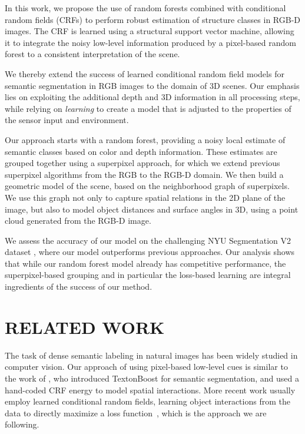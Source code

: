 \documentclass[a4paper, 10pt, conference]{ieeeconf}      %
\begin{document}
In this work, we propose the use of random forests combined with conditional
random fields (CRFs) to perform robust estimation of structure classes in RGB-D
images. The CRF is learned using a structural support vector machine,
allowing it to integrate the noisy low-level information produced by a pixel-based
random forest to a consistent interpretation of the scene.

We thereby extend the success of learned conditional random field models for
semantic segmentation in RGB images to the domain of 3D scenes.
Our emphasis lies on exploiting the additional depth and 3D information in all
processing steps, while relying on \emph{learning} to create a model that 
is adjusted to the properties of the sensor input and environment.

Our approach starts with a random forest, providing a noisy local estimate
of semantic classes based on color and depth information. These estimates
are grouped together using a superpixel approach, for which we extend previous
superpixel algorithms from the RGB to the RGB-D domain.
We then build a geometric model of the scene, based on the neighborhood graph
of superpixels.  We use this graph not only to capture spatial relations in the
2D plane of the image, but also to model object distances and surface angles in
3D, using a point cloud generated from the RGB-D image.

We assess the accuracy of our model on the challenging NYU Segmentation V2
dataset \citep{SilbermanECCV12}, where our model outperforms previous
approaches.  Our analysis shows that while our random forest model
already has competitive performance, the superpixel-based grouping and in
particular the loss-based learning are integral ingredients of the success of our method.

\section{RELATED WORK}
The task of dense semantic labeling in natural images has been widely studied
in computer vision.  Our approach of using pixel-based low-level cues is
similar to the work of \citet{shotton2006textonboost}, who introduced
TextonBoost for semantic segmentation, and used a hand-coded CRF energy to
model spatial interactions. More recent work usually employ learned conditional
random fields, learning object interactions from the
data to directly maximize a loss function~\citep{lucchi2013learning, krahenbuhl2012efficient},
which is the approach we are following.
\end{document}
